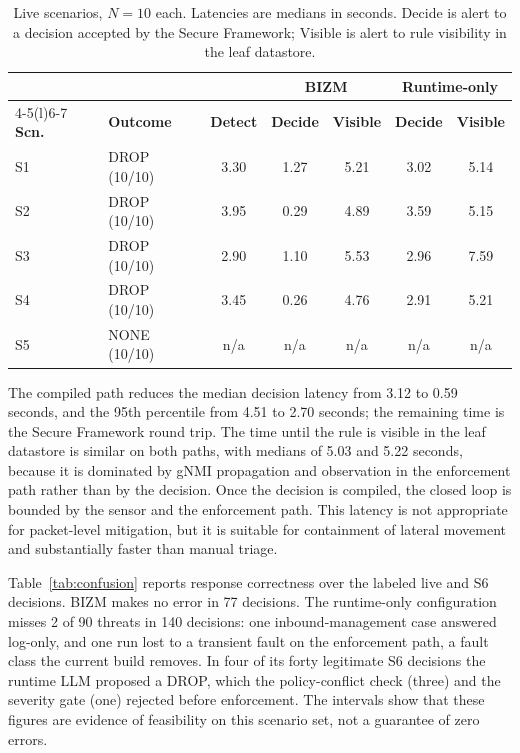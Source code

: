 \documentclass[final,5p]{elsarticle}
\begin{document}
\begin{table}[t]
    \centering
    \caption{Live scenarios, $N=10$ each. Latencies are medians in seconds. Decide is alert to a decision accepted by the Secure Framework; Visible is alert to rule visibility in the leaf datastore.}
    \label{tab:functional}
    \small
    \setlength{\tabcolsep}{3.2pt}
    \begin{tabular}{@{}llccccc@{}}
        \toprule
        & & & \multicolumn{2}{c}{\textbf{BIZM}} & \multicolumn{2}{c}{\textbf{Runtime-only}} \\
        \cmidrule(lr){4-5}\cmidrule(l){6-7}
        \textbf{Scn.} & \textbf{Outcome} & \textbf{Detect} & \textbf{Decide} & \textbf{Visible} & \textbf{Decide} & \textbf{Visible} \\
        \midrule
        S1 & DROP (10/10) & 3.30 & 1.27 & 5.21 & 3.02 & 5.14 \\
        S2 & DROP (10/10) & 3.95 & 0.29 & 4.89 & 3.59 & 5.15 \\
        S3 & DROP (10/10) & 2.90 & 1.10 & 5.53 & 2.96 & 7.59 \\
        S4 & DROP (10/10) & 3.45 & 0.26 & 4.76 & 2.91 & 5.21 \\
        S5 & NONE (10/10) & n/a  & n/a  & n/a  & n/a  & n/a  \\
        \bottomrule
    \end{tabular}
\end{table}

The compiled path reduces the median decision latency from 3.12 to 0.59 seconds, and the 95th percentile from 4.51 to 2.70 seconds; the remaining time is the Secure Framework round trip. The time until the rule is visible in the leaf datastore is similar on both paths, with medians of 5.03 and 5.22 seconds, because it is dominated by gNMI propagation and observation in the enforcement path rather than by the decision. Once the decision is compiled, the closed loop is bounded by the sensor and the enforcement path. This latency is not appropriate for packet-level mitigation, but it is suitable for containment of lateral movement and substantially faster than manual triage.

Table~\ref{tab:confusion} reports response correctness over the labeled live and S6 decisions. BIZM makes no error in 77 decisions. The runtime-only configuration misses 2 of 90 threats in 140 decisions: one inbound-management case answered log-only, and one run lost to a transient fault on the enforcement path, a fault class the current build removes. In four of its forty legitimate S6 decisions the runtime LLM proposed a DROP, which the policy-conflict check (three) and the severity gate (one) rejected before enforcement. The intervals show that these figures are evidence of feasibility on this scenario set, not a guarantee of zero errors.
\end{document}
